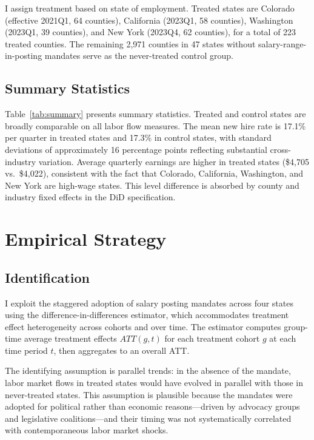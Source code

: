 \documentclass[12pt]{article}
\begin{document}
I assign treatment based on state of employment. Treated states are Colorado (effective 2021Q1, 64 counties), California (2023Q1, 58 counties), Washington (2023Q1, 39 counties), and New York (2023Q4, 62 counties), for a total of 223 treated counties. The remaining 2,971 counties in 47 states without salary-range-in-posting mandates serve as the never-treated control group.

\subsection{Summary Statistics}



Table~\ref{tab:summary} presents summary statistics. Treated and control states are broadly comparable on all labor flow measures. The mean new hire rate is 17.1\% per quarter in treated states and 17.3\% in control states, with standard deviations of approximately 16 percentage points reflecting substantial cross-industry variation. Average quarterly earnings are higher in treated states (\$4,705 vs.\ \$4,022), consistent with the fact that Colorado, California, Washington, and New York are high-wage states. This level difference is absorbed by county and industry fixed effects in the DiD specification.


\section{Empirical Strategy}

\subsection{Identification}

I exploit the staggered adoption of salary posting mandates across four states using the \citet{callaway2021difference} difference-in-differences estimator, which accommodates treatment effect heterogeneity across cohorts and over time. The estimator computes group-time average treatment effects $ATT(g,t)$ for each treatment cohort $g$ at each time period $t$, then aggregates to an overall ATT.

The identifying assumption is parallel trends: in the absence of the mandate, labor market flows in treated states would have evolved in parallel with those in never-treated states. This assumption is plausible because the mandates were adopted for political rather than economic reasons---driven by advocacy groups and legislative coalitions---and their timing was not systematically correlated with contemporaneous labor market shocks.
\end{document}
